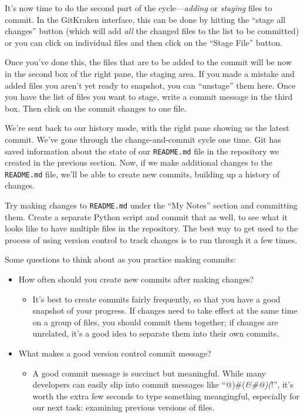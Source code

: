 \documentclass[]{Nemilov}
\providecommand{\tightlist}{%
  \setlength{\itemsep}{0pt}\setlength{\parskip}{0pt}}
\begin{document}
It's now time to do the second part of the cycle---\emph{adding} or \emph{staging} files to commit. In the GitKraken interface, this can be done by hitting the ``stage all changes'' button (which will add \emph{all} the changed files to the list to be committed) or you can click on individual files and then click on the ``Stage File'' button.

Once you've done this, the files that are to be added to the commit will be now in the second box of the right pane, the staging area. If you made a mistake and added files you aren't yet ready to snapshot, you can ``unstage'' them here. Once you have the list of files you want to stage, write a commit message in the third box. Then click on the commit changes to one file.

We're sent back to our history mode, with the right pane showing us the latest commit. We've gone through the change-and-commit cycle one time. Git has saved
information about the state of our \texttt{README.md} file in the repository we created
in the previous section. Now, if we make additional changes to the \texttt{README.md}
file, we'll be able to create new commits, building up a history of changes.

Try making changes to \texttt{README.md} under the ``My Notes'' section
and committing them. Create a separate Python script and
commit that as well, to see what it looks like to have multiple files in
the repository. The best way to get used to the process of using version
control to track changes is to run through it a few times.

Some questions to think about as you practice making commits:

\begin{itemize}
\tightlist
\item
  How often should you create new commits after making changes?

  \begin{itemize}
  \tightlist
  \item
    It's best to create commits fairly frequently, so that you have a good snapshot of your progress. If changes need to take effect at the same time on a group of files, you should commit them together; if changes are unrelated, it's a good idea to separate them into their own commits.
  \end{itemize}
\item
  What makes a good version control commit message?

  \begin{itemize}
  \tightlist
  \item
    A good commit message is succinct but meaningful. While many
    developers can easily slip into commit messages like ``@)\#(\emph{\&\#@)(}!'', it's
    worth the extra few seconds to type something meangingful, especially for our
    next task: examining previous versions of files.
  \end{itemize}
\end{itemize}
\end{document}
